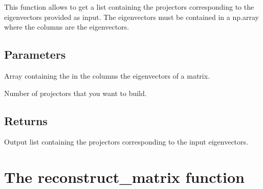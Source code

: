 \documentclass[letterpaper,10pt,english]{sphinxmanual}
\begin{document}
\begin{fulllineitems}
\label{\detokenize{index:hicanalysis.preprocessing.build_projectors}}
\pysigstartsignatures
{}
\pysigstopsignatures
\sphinxAtStartPar
This function allows to get a list containing the projectors corresponding to the eigenvectors provided
as input. The eigenvectors must be contained in a np.array where the columns are the eigenvectors.


\subsection{Parameters}
\label{\detokenize{index:id9}}\begin{description}
\sphinxAtStartPar
Array containing the in the columns the eigenvectors of a matrix.

\sphinxAtStartPar
Number of projectors that you want to build.

\end{description}


\subsection{Returns}
\label{\detokenize{index:id10}}\begin{description}
\sphinxAtStartPar
Output list containing the projectors corresponding to the input eigenvectors.

\end{description}

\end{fulllineitems}



\section{The reconstruct\_matrix function}
\label{\detokenize{index:the-reconstruct-matrix-function}}
\end{document}
